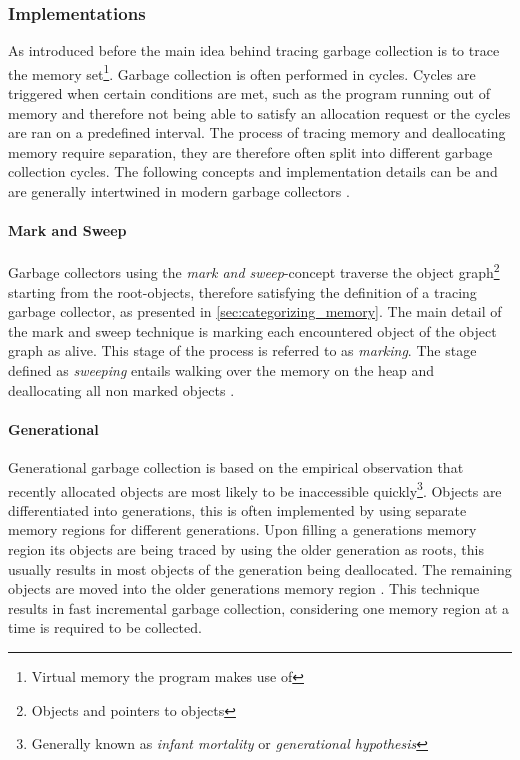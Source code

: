 \subsubsection{Implementations}

As introduced before the main idea behind tracing garbage collection is to
trace the memory set\footnote{Virtual memory the program makes use of}. Garbage
collection is often performed in cycles. Cycles are triggered when certain
conditions are met, such as the program running out of memory and therefore not
being able to satisfy an allocation request or the cycles are ran on a
predefined interval. The process of tracing memory and deallocating memory
require separation, they are therefore often split into different garbage
collection cycles. The following concepts and implementation details can be and
are generally intertwined in modern garbage collectors \cite[The GC
cycle]{go_gcguide_2022} \cite{ocmal_gc_unknown}.

\paragraph{Mark and Sweep}

Garbage collectors using the \textit{mark and sweep}-concept traverse the
object graph\footnote{Objects and pointers to objects} starting from the
root-objects, therefore satisfying the definition of a tracing garbage
collector, as presented in \autoref{sec:categorizing_memory}. The main detail
of the mark and sweep technique is marking each encountered object of the
object graph as alive. This stage of the process is referred to as
\textit{marking}. The stage defined as \textit{sweeping} entails walking over
the memory on the heap and deallocating all non marked objects \cite[Tracing
Garbage Collection]{go_gcguide_2022}.

\paragraph{Generational}
\label{sec:gc_generational}

Generational garbage collection is based on the empirical observation that
recently allocated objects are most likely to be inaccessible
quickly\footnote{Generally known as \textit{infant mortality} or
\textit{generational hypothesis}}. Objects are differentiated into generations,
this is often implemented by using separate memory regions for different
generations. Upon filling a generations memory region its objects are being
traced by using the older generation as roots, this usually results in most
objects of the generation being deallocated. The remaining objects are moved
into the older generations memory region \cite[2 Age-based Garbage
Collection]{age-based-gc_1999}. This technique results in fast incremental
garbage collection, considering one memory region at a time is required to be
collected. \cite[3 Benchmarks]{age-based-gc_1999}

